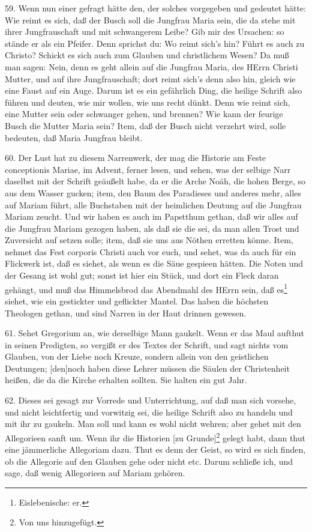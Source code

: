 59. Wenn nun einer gefragt hätte den, der solches vorgegeben und gedeutet hätte: Wie reimt es sich, daß der Busch soll die Jungfrau Maria sein, die da stehe mit ihrer Jungfrauschaft und mit schwangerem Leibe? Gib mir des Ursachen: so stände er als ein Pfeifer. Denn sprichst du: Wo reimt sich’s hin? Führt es auch zu Christo? Schickt es sich auch zum Glauben und christlichem Wesen? Da muß man sagen: Nein, denn es geht allein auf die Jungfrau Maria, des HErrn Christi Mutter, und auf ihre Jungfrauschaft; dort reimt sich’s denn also hin, gleich wie eine Faust auf ein Auge. Darum ist es ein gefährlich Ding, die heilige Schrift also führen und deuten, wie mir wollen, wie uns recht dünkt. Denn wie reimt sich, eine Mutter sein oder schwanger gehen, und brennen? Wie kann der feurige Busch die Mutter Maria sein? Item, daß der Busch nicht verzehrt wird, solle bedeuten, daß Maria Jungfrau bleibt.

60. Der Lust hat zu diesem Narrenwerk, der mag die Historie am Feste conceptionis Mariae, im Advent, ferner lesen, und sehen, was der selbige Narr daselbst mit der Schrift geäußelt habe, da er die Arche Noäh, die hohen Berge, so aus dem Wasser gucken; item, den Baum des Paradieses und anderes mehr, alles auf Mariam führt, alle Buchstaben mit der heimlichen Deutung auf die Jungfrau Mariam zeucht. Und wir haben es auch im Papstthum gethan, daß wir alles auf die Jungfrau Mariam gezogen haben, als daß sie die sei, da man allen Trost und Zuversicht auf setzen solle; item, daß sie uns aus Nöthen erretten könne. Item, nehmet das Fest corporis Christi auch vor euch, und sehet, was da auch für ein Flickwerk ist, daß es siehet, als wenn es die Säue gespieen hätten. Die Noten und der Gesang ist wohl gut; sonst ist hier ein Stück, und dort ein Fleck daran gehängt, und muß das Himmelsbrod das Abendmahl des HErrn sein, daß es\footnote{Eislebenische: er.} siehet, wie ein gestickter und geflickter Mantel. Das haben die höchsten Theologen gethan, und sind Narren in der Haut drinnen gewesen.

61. Sehet Gregorium an, wie derselbige Mann gaukelt. Wenn er das Maul aufthut in seinen Predigten, so vergißt er des Textes der Schrift, und sagt nichts vom Glauben, von der Liebe noch Kreuze, sondern allein von den geistlichen Deutungen; [den]noch haben diese Lehrer müssen die Säulen der Christenheit heißen, die da die Kirche erhalten sollten. Sie halten ein gut Jahr.

62. Dieses sei gesagt zur Vorrede und Unterrichtung, auf daß man sich vorsehe, und nicht leichtfertig und vorwitzig sei, die heilige Schrift also zu handeln und mit ihr zu gaukeln. Man soll und kann es wohl nicht wehren; aber gehet mit den Allegorieen sanft um. Wenn ihr die Historien [zu Grunde]\footnote{Von uns hinzugefügt.} gelegt habt, dann thut
eine jämmerliche Allegoriam dazu. Thut es denn der Geist, so wird es sich finden, ob die Allegorie auf den Glauben gehe oder nicht etc. Darum schließe ich, und sage, daß wenig Allegorieen auf Mariam gehören.

